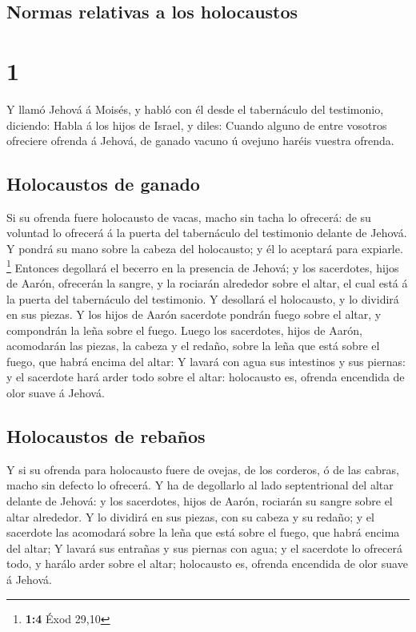 \hypertarget{normas-relativas-a-los-holocaustos}{%
\subsection{Normas relativas a los
holocaustos}\label{normas-relativas-a-los-holocaustos}}

\hypertarget{section}{%
\section{1}\label{section}}

 Y llamó Jehová á Moisés, y habló con él desde el
tabernáculo del testimonio, diciendo:  Habla á los hijos de
Israel, y diles: Cuando alguno de entre vosotros ofreciere ofrenda á
Jehová, de ganado vacuno ú ovejuno haréis vuestra ofrenda.

\hypertarget{holocaustos-de-ganado}{%
\subsection{Holocaustos de ganado}\label{holocaustos-de-ganado}}

 Si su ofrenda fuere holocausto de vacas, macho sin tacha lo
ofrecerá: de su voluntad lo ofrecerá á la puerta del tabernáculo del
testimonio delante de Jehová.  Y pondrá su mano sobre la
cabeza del holocausto; y él lo aceptará para expiarle. \footnote{\textbf{1:4}
  Éxod 29,10}  Entonces degollará el becerro en la presencia
de Jehová; y los sacerdotes, hijos de Aarón, ofrecerán la sangre, y la
rociarán alrededor sobre el altar, el cual está á la puerta del
tabernáculo del testimonio.  Y desollará el holocausto, y lo
dividirá en sus piezas.  Y los hijos de Aarón sacerdote
pondrán fuego sobre el altar, y compondrán la leña sobre el fuego.
 Luego los sacerdotes, hijos de Aarón, acomodarán las
piezas, la cabeza y el redaño, sobre la leña que está sobre el fuego,
que habrá encima del altar:  Y lavará con agua sus
intestinos y sus piernas: y el sacerdote hará arder todo sobre el altar:
holocausto es, ofrenda encendida de olor suave á Jehová.

\hypertarget{holocaustos-de-rebauxf1os}{%
\subsection{Holocaustos de rebaños}\label{holocaustos-de-rebauxf1os}}

 Y si su ofrenda para holocausto fuere de ovejas, de los
corderos, ó de las cabras, macho sin defecto lo ofrecerá. 
Y ha de degollarlo al lado septentrional del altar delante de Jehová: y
los sacerdotes, hijos de Aarón, rociarán su sangre sobre el altar
alrededor.  Y lo dividirá en sus piezas, con su cabeza y su
redaño; y el sacerdote las acomodará sobre la leña que está sobre el
fuego, que habrá encima del altar;  Y lavará sus entrañas y
sus piernas con agua; y el sacerdote lo ofrecerá todo, y harálo arder
sobre el altar; holocausto es, ofrenda encendida de olor suave á Jehová.

